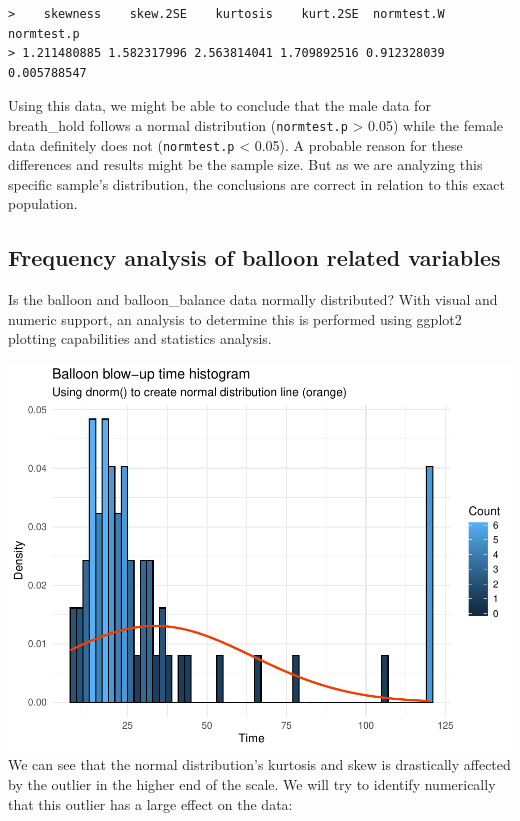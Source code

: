 \documentclass[]{article}
\newenvironment{Shaded}{\begin{snugshade}}{\end{snugshade}}
\newcommand{\KeywordTok}[1]{\textcolor[rgb]{0.13,0.29,0.53}{\textbf{#1}}}
\newcommand{\NormalTok}[1]{#1}
\newcommand{\OperatorTok}[1]{\textcolor[rgb]{0.81,0.36,0.00}{\textbf{#1}}}
\newcommand{\StringTok}[1]{\textcolor[rgb]{0.31,0.60,0.02}{#1}}
\begin{document}
\begin{verbatim}
>    skewness    skew.2SE    kurtosis    kurt.2SE  normtest.W  normtest.p 
> 1.211480885 1.582317996 2.563814041 1.709892516 0.912328039 0.005788547
\end{verbatim}

Using this data, we might be able to conclude that the male data for breath\_hold follows a normal distribution (\texttt{normtest.p} \textgreater{} 0.05) while the female data definitely does not (\texttt{normtest.p} \textless{} 0.05). A probable reason for these differences and results might be the sample size. But as we are analyzing this specific sample's distribution, the conclusions are correct in relation to this exact population.

\hypertarget{frequency-analysis-of-balloon-related-variables}{%
\subsection{Frequency analysis of balloon related variables}\label{frequency-analysis-of-balloon-related-variables}}

Is the balloon and balloon\_balance data normally distributed? With visual and numeric support, an analysis to determine this is performed using ggplot2 plotting capabilities and statistics analysis.

\begin{Shaded}
\end{Shaded}

\includegraphics{Personality-Data-Analysis-Portfolio-1_files/figure-latex/unnamed-chunk-10-1.pdf}
We can see that the normal distribution's kurtosis and skew is drastically affected by the outlier in the higher end of the scale. We will try to identify numerically that this outlier has a large effect on the data:
\end{document}
